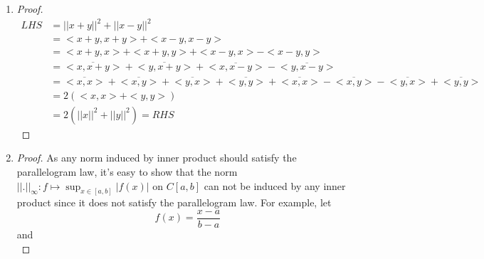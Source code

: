 \documentclass[paper=a4, fontsize=11pt]{scrartcl} %
\numberwithin{equation}{section} %
\numberwithin{figure}{section} %
\numberwithin{table}{section} %
\begin{document}
\begin{enumerate}
\begin{proof}
\begin{equation}
\begin{aligned}
						= & \frac{i}{2} (<x, iy> + <iy, x>)\\
						= & \frac{i}{2} (i<x, y> + \overline{i}<y, x>)\\
						= & \frac{1}{2} (-<x, y> + <y,x>)
					\end{aligned}
				\end{equation}
				Thus
				\begin{equation}
					\begin{aligned}
						RHS & = \frac{1}{4} (||x+y||^2  - ||x-y||^2) - \frac{i}{4} (||x+iy||^2  - ||x-iy||^2)\\
						    & = \frac{1}{2}(<x, y> + <y, x>) - \frac{1}{2} (-<x, y> + <y,x>)\\
						    & = <x, y> = LHS
					\end{aligned}
				\end{equation}
			\end{proof}
		\item 
			\begin{proof}
				\begin{equation}
					\begin{aligned}
						LHS & = ||x+y||^2 + ||x-y||^2\\
						    & = <x+y, x+y> + <x-y, x-y>\\
						    & = <x+y, x> + <x+y, y> + <x-y, x> - <x-y, y>\\
						    & = \overline{<x, x+y>} + \overline{<y, x+y>} + \overline{<x, x-y>} - \overline{<y, x-y>}\\
						    & = \overline{<x, x>} + \overline{<x, y>} + \overline{<y, x>} + \overline{<y, y>} + \overline{<x, x>} - \overline{<x, y>} - \overline{<y, x>} + \overline{<y, y>}\\
						    & = 2(<x, x>+<y, y>)\\
						    & = 2(||x||^2 + ||y||^2) = RHS
					\end{aligned}
				\end{equation}
			\end{proof}	
		\item 
			\begin{proof}
				As any norm induced by inner product should satisfy the parallelogram law, it's easy to show that the norm $||.||_\infty : f\mapsto \sup_{x\in [a, b]} |f(x)|$ on $C[a, b]$ can not be induced by any inner product since it does not satisfy the parallelogram law. For example, let
				\begin{equation}
					f(x) = \frac{x-a}{b-a}
				\end{equation}
				and
				\begin{equation}

\end{equation}
\end{proof}
\end{enumerate}
\end{document}
